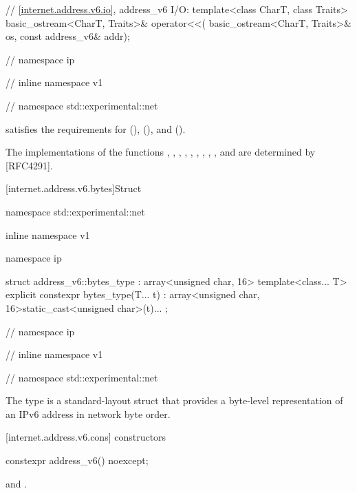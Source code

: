 \begin{codeblock}
{{{  // \ref{internet.address.v6.io}, address_v6 I/O:
  template<class CharT, class Traits>
    basic_ostream<CharT, Traits>& operator<<(
      basic_ostream<CharT, Traits>& os, const address_v6& addr);

} // namespace ip
} // inline namespace v1
} // namespace std::experimental::net
\end{codeblock}

\pnum
{} satisfies the requirements for  (),  (), and  ().

\pnum
\begin{note} The implementations of the functions , , , , , , , , ,  and  are determined by [RFC4291]. \end{note}


[internet.address.v6.bytes]{Struct }

%
\begin{codeblock}
namespace std::experimental::net {
inline namespace v1 {
namespace ip {

  struct address_v6::bytes_type : array<unsigned char, 16>
  {
    template<class... T> explicit constexpr bytes_type(T... t)
      : array<unsigned char, 16>{{static_cast<unsigned char>(t)...}} {}
  };

} // namespace ip
} // inline namespace v1
} // namespace std::experimental::net
\end{codeblock}

\pnum
The  type is a standard-layout struct that provides a byte-level representation of an IPv6 address in network byte order.



%
[internet.address.v6.cons]{ constructors}

\begin{itemdecl}
constexpr address_v6() noexcept;
\end{itemdecl}

\begin{itemdescr}
\pnum
\postconditions {} and .
\end{itemdescr}


